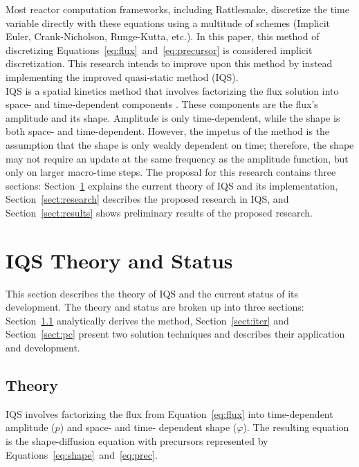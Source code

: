 \documentclass[12pt]{scrartcl}
\newcommand{\eqt}[1]{Equation~\ref{#1}}                     %
\newcommand{\sct}[1]{Section~\ref{#1}}                   %
\begin{document}
Most reactor computation frameworks, including Rattlesnake, discretize the time variable directly with these equations using a multitude of schemes (Implicit Euler, Crank-Nicholson, Runge-Kutta, etc.).  In this paper, this method of discretizing Equations~\ref{eq:flux}~and~\ref{eq:precursor} is considered implicit discretization.  This research intends to improve upon this method by instead implementing the improved quasi-static method (IQS). \\

IQS is a spatial kinetics method that involves factorizing the flux solution into space- and time-dependent components \cite{Ott_1966,Dulla2008}.  These components are the flux's amplitude and its shape. Amplitude is only time-dependent, while the shape is both space- and time-dependent.  However, the impetus of the method is the assumption that the shape is only weakly dependent on time; therefore, the shape may not require an update at the same frequency as the amplitude function, but only on larger macro-time steps. The proposal for this research contains three sections: \sct{sect:back} explains the current theory of IQS and its implementation, \sct{sect:research} describes the proposed research in IQS, and \sct{sect:results} shows preliminary results of the proposed research.


\section{IQS Theory and Status}
\label{sect:back}

This section describes the theory of IQS and the current status of its development.  The theory and status are broken up into three sections: \sct{sect:theory} analytically derives the method, \sct{sect:iter} and \sct{sect:pc} present two solution techniques and describes their application and development.

\subsection{Theory}
\label{sect:theory}

IQS involves factorizing the flux from \eqt{eq:flux} into time-dependent amplitude ($p$) and space- and time- dependent shape ($\varphi$).  The resulting equation is the shape-diffusion equation with precursors represented by Equations~\ref{eq:shape}~and~\ref{eq:prec}.
\end{document}
